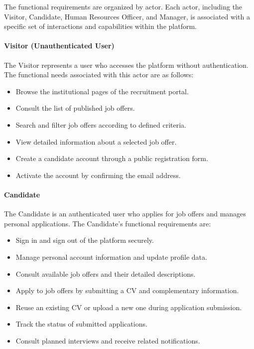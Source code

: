 The functional requirements are organized by actor. Each actor, including the Visitor, Candidate, Human Resources Officer, and Manager, is associated with a specific set of interactions and capabilities within the platform.

\paragraph*{Visitor (Unauthenticated User)}

The Visitor represents a user who accesses the platform without authentication. The functional needs associated with this actor are as follows:

\begin{itemize}[label={-}]
    \item Browse the institutional pages of the recruitment portal.
    \item Consult the list of published job offers.
    \newpage


    \item Search and filter job offers according to defined criteria.
    \item View detailed information about a selected job offer.
    \item Create a candidate account through a public registration form.
    \item Activate the account by confirming the email address.
\end{itemize}

\paragraph*{Candidate}

The Candidate is an authenticated user who applies for job offers and manages personal applications. The Candidate's functional requirements are:

\begin{itemize}[label={-}]
    \item Sign in and sign out of the platform securely.
    \item Manage personal account information and update profile data.
    \item Consult available job offers and their detailed descriptions.
    \item Apply to job offers by submitting a CV and complementary information.
    \item Reuse an existing CV or upload a new one during application submission.
    \item Track the status of submitted applications.
    \item Consult planned interviews and receive related notifications.
\end{itemize}

